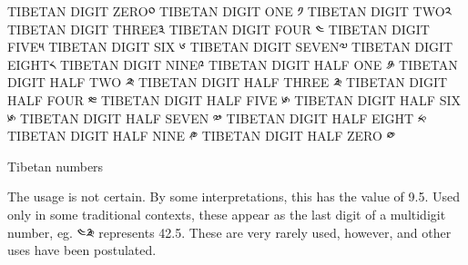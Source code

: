 {
\obeylines
\small
TIBETAN DIGIT ZERO\tibetan	༠
TIBETAN DIGIT ONE	\tibetan༡	
TIBETAN DIGIT TWO\tibetan	༢	
TIBETAN DIGIT THREE\tibetan	༣	
TIBETAN DIGIT FOUR	\tibetan ༤	
TIBETAN DIGIT FIVE\tibetan	༥	
TIBETAN DIGIT SIX	\tibetan ༦	
TIBETAN DIGIT SEVEN\tibetan	༧	
TIBETAN DIGIT EIGHT\tibetan	༨	
TIBETAN DIGIT NINE\tibetan	༩	
TIBETAN DIGIT HALF ONE	\tibetan༪	
TIBETAN DIGIT HALF TWO	༫	
TIBETAN DIGIT HALF THREE	༬
TIBETAN DIGIT HALF FOUR ༭	
TIBETAN DIGIT HALF FIVE ༯	
TIBETAN DIGIT HALF SIX	 ༯	
TIBETAN DIGIT HALF SEVEN	༰	
TIBETAN DIGIT HALF EIGHT	༱	
TIBETAN DIGIT HALF NINE	༲	
TIBETAN DIGIT HALF ZERO	༳	
}


Tibetan numbers

The usage is not certain. By some interpretations, this has the value of 9.5. Used only in some traditional contexts, these appear as the last digit of a multidigit number, eg. ༤༬ represents 42.5. These are very rarely used, however, and other uses have been postulated.



